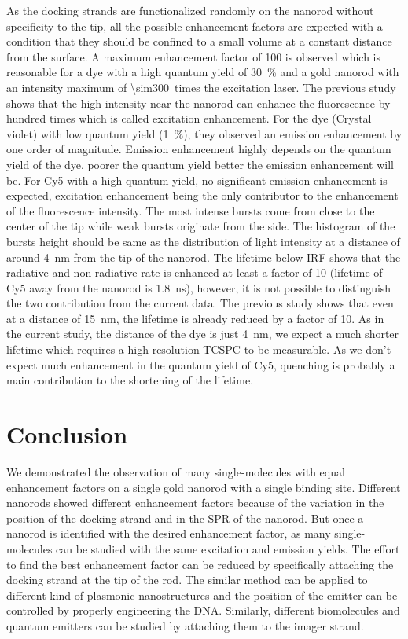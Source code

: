 As the docking strands are functionalized randomly on the nanorod without specificity to the tip, all the possible enhancement factors are expected with a condition that they should be confined to a small volume at a constant distance from the surface.
A maximum enhancement factor of 100 is observed which is reasonable for a dye with a high quantum yield of \SI{30}{\percent} and a gold nanorod with an intensity maximum of \SI{\sim300}{times} the excitation laser.
The previous study shows that the high intensity near the nanorod can enhance the fluorescence by hundred times which is called excitation enhancement.
For the dye (Crystal violet) with low quantum yield (\SI{1}{\percent}), they observed an emission enhancement by one order of magnitude.
Emission enhancement highly depends on the quantum yield of the dye, poorer the quantum yield better the emission enhancement will be.
For Cy5 with a high quantum yield, no significant emission enhancement is expected, excitation enhancement being the only contributor to the enhancement of the fluorescence intensity.
The most intense bursts come from close to the center of the tip while weak bursts originate from the side.
The histogram of the bursts height should be same as the distribution of light intensity at a distance of around \SI{4}{\nm} from the tip of the nanorod.
The lifetime below IRF shows that the radiative and non-radiative rate is enhanced at least a factor of 10 (lifetime of Cy5 away from the nanorod is \SI{1.8}{\ns}), however, it is not possible to distinguish the two contribution from the current data.
The previous study\cite{seelig2007nanoparticleinduced} shows that even at a distance of \SI{15}{\nm}, the lifetime is already reduced by a factor of 10.
As in the current study, the distance of the dye is just \SI{4}{\nm}, we expect a much shorter lifetime which requires a high-resolution TCSPC to be measurable.
As we don't expect much enhancement in the quantum yield of Cy5, quenching is probably a main contribution to the shortening of the lifetime.

\section{Conclusion}
We demonstrated the observation of many single-molecules with equal enhancement factors on a single gold nanorod with a single binding site.
Different nanorods showed different enhancement factors because of the variation in the position of the docking strand and in the SPR of the nanorod.
But once a nanorod is identified with the desired enhancement factor, as many single-molecules can be studied with the same excitation and emission yields.
The effort to find the best enhancement factor can be reduced by specifically attaching the docking strand at the tip of the rod.
The similar method can be applied to different kind of plasmonic nanostructures and the position of the emitter can be controlled by properly engineering the DNA.
Similarly, different biomolecules and quantum emitters can be studied by attaching them to the imager strand.

